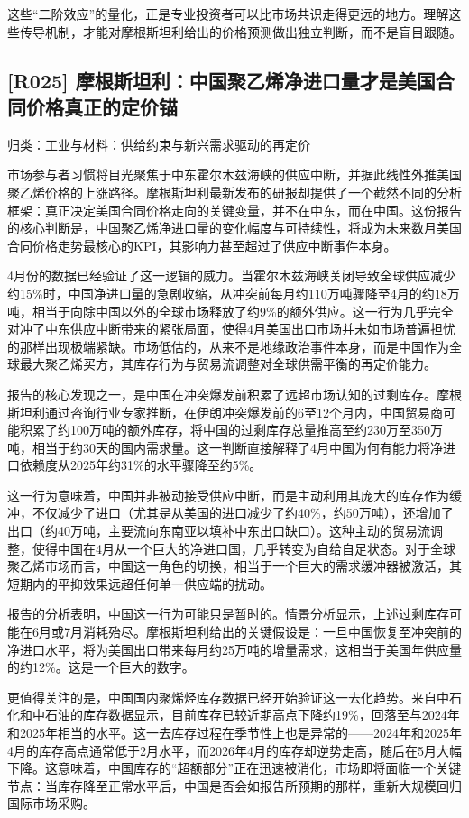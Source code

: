 \documentclass[11pt]{ctexart}
\begin{document}
这些“二阶效应”的量化，正是专业投资者可以比市场共识走得更远的地方。理解这些传导机制，才能对摩根斯坦利给出的价格预测做出独立判断，而不是盲目跟随。

\subsection{[R025] 摩根斯坦利：中国聚乙烯净进口量才是美国合同价格真正的定价锚}
{\small\color{refgray}归类：工业与材料：供给约束与新兴需求驱动的再定价}

市场参与者习惯将目光聚焦于中东霍尔木兹海峡的供应中断，并据此线性外推美国聚乙烯价格的上涨路径。摩根斯坦利最新发布的研报却提供了一个截然不同的分析框架：真正决定美国合同价格走向的关键变量，并不在中东，而在中国。这份报告的核心判断是，中国聚乙烯净进口量的变化幅度与可持续性，将成为未来数月美国合同价格走势最核心的KPI，其影响力甚至超过了供应中断事件本身。

4月份的数据已经验证了这一逻辑的威力。当霍尔木兹海峡关闭导致全球供应减少约15\%时，中国净进口量的急剧收缩，从冲突前每月约110万吨骤降至4月的约18万吨，相当于向除中国以外的全球市场释放了约9\%的额外供应。这一行为几乎完全对冲了中东供应中断带来的紧张局面，使得4月美国出口市场并未如市场普遍担忧的那样出现极端紧缺。市场低估的，从来不是地缘政治事件本身，而是中国作为全球最大聚乙烯买方，其库存行为与贸易流调整对全球供需平衡的再定价能力。

报告的核心发现之一，是中国在冲突爆发前积累了远超市场认知的过剩库存。摩根斯坦利通过咨询行业专家推断，在伊朗冲突爆发前的6至12个月内，中国贸易商可能积累了约100万吨的额外库存，将中国的过剩库存总量推高至约230万至350万吨，相当于约30天的国内需求量。这一判断直接解释了4月中国为何有能力将净进口依赖度从2025年约31\%的水平骤降至约5\%。

这一行为意味着，中国并非被动接受供应中断，而是主动利用其庞大的库存作为缓冲，不仅减少了进口（尤其是从美国的进口减少了约40\%，约50万吨），还增加了出口（约40万吨，主要流向东南亚以填补中东出口缺口）。这种主动的贸易流调整，使得中国在4月从一个巨大的净进口国，几乎转变为自给自足状态。对于全球聚乙烯市场而言，中国这一角色的切换，相当于一个巨大的需求缓冲器被激活，其短期内的平抑效果远超任何单一供应端的扰动。

报告的分析表明，中国这一行为可能只是暂时的。情景分析显示，上述过剩库存可能在6月或7月消耗殆尽。摩根斯坦利给出的关键假设是：一旦中国恢复至冲突前的净进口水平，将为美国出口带来每月约25万吨的增量需求，这相当于美国年供应量的约12\%。这是一个巨大的数字。

更值得关注的是，中国国内聚烯烃库存数据已经开始验证这一去化趋势。来自中石化和中石油的库存数据显示，目前库存已较近期高点下降约19\%，回落至与2024年和2025年相当的水平。这一去库存过程在季节性上也是异常的——2024年和2025年4月的库存高点通常低于2月水平，而2026年4月的库存却逆势走高，随后在5月大幅下降。这意味着，中国库存的“超额部分”正在迅速被消化，市场即将面临一个关键节点：当库存降至正常水平后，中国是否会如报告所预期的那样，重新大规模回归国际市场采购。
\end{document}
